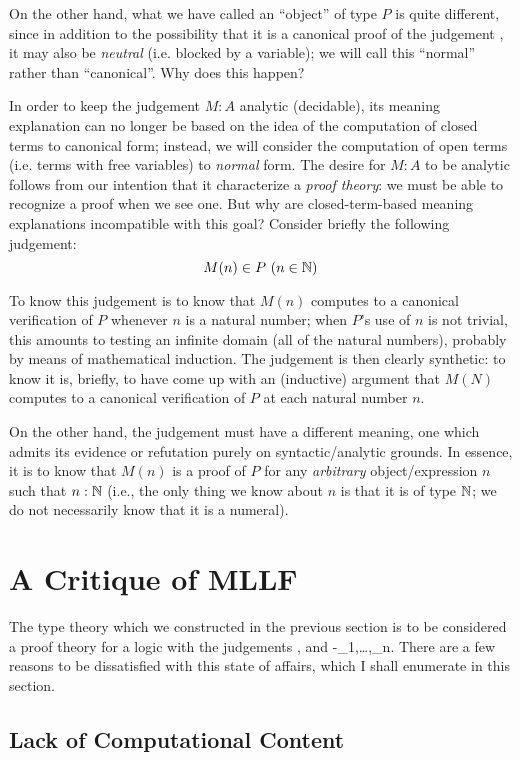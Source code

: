 \documentclass[main.tex]{subfiles}
\begin{document}
On the other hand, what we have called an ``object'' of type $P$ is quite
different, since in addition to the possibility that it is a canonical proof of
the judgement , it may also be \emph{neutral} (i.e. blocked by a
variable); we will call this ``normal'' rather than ``canonical''. Why does
this happen?

In order to keep the judgement $M:A$ analytic (decidable), its meaning
explanation can no longer be based on the idea of the computation of closed
terms to canonical form; instead, we will consider the computation of open
terms (i.e. terms with free variables) to \emph{normal} form. The desire for
$M:A$ to be analytic follows from our intention that it characterize a
\emph{proof theory}: we must be able to recognize a proof when we see one. But
why are closed-term-based meaning explanations incompatible with this goal?
Consider briefly the following judgement:
\[
  M(n) \in P\ (n\in\mathbb{N})
\]

To know this judgement is to know that $M(n)$ computes to a canonical
verification of $P$ whenever $n$ is a natural number; when $P$'s use of $n$ is
not trivial, this amounts to testing an infinite domain (all of the natural
numbers), probably by means of mathematical induction. The judgement is then
clearly synthetic: to know it is, briefly, to have come up with an (inductive)
argument that $M(N)$ computes to a canonical verification of $P$ at each
natural number $n$.

On the other hand, the judgement  must have a
different meaning, one which admits its evidence or refutation purely on
syntactic/analytic grounds. In essence, it is to know that $M(n)$ is a proof of
$P$ for any \emph{arbitrary} object/expression $n$ such that $n:\mathbb{N}$
(i.e., the only thing we know about $n$ is that it is of type $\mathbb{N}$; we
do not necessarily know that it is a numeral).


\section{A Critique of \textbf{MLLF}}

The type theory which we constructed in the previous section is to be
considered a proof theory for a logic with the judgements ,
 and \hyp{}{_1,\dots,_n}. There are
a few reasons to be dissatisfied with this state of affairs, which I shall
enumerate in this section.

\subsection{Lack of Computational Content}
\end{document}
